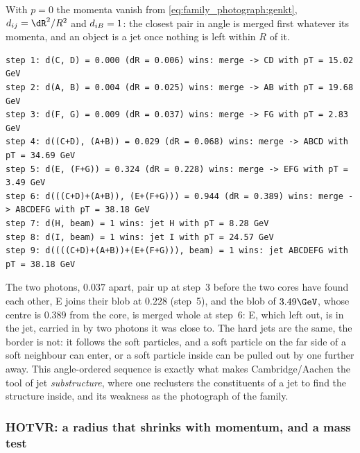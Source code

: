 With $p=0$ the momenta vanish from \cref{eq:family_photograph:genkt},
$\dij=\dR^2/R^2$ and $d_{iB}=1$: the closest pair in angle is merged first
whatever its momenta, and an object is a jet once nothing is left within
$R$ of it.
\begin{verbatim}
step 1: d(C, D) = 0.000 (dR = 0.006) wins: merge -> CD with pT = 15.02 GeV
step 2: d(A, B) = 0.004 (dR = 0.025) wins: merge -> AB with pT = 19.68 GeV
step 3: d(F, G) = 0.009 (dR = 0.037) wins: merge -> FG with pT = 2.83 GeV
step 4: d((C+D), (A+B)) = 0.029 (dR = 0.068) wins: merge -> ABCD with pT = 34.69 GeV
step 5: d(E, (F+G)) = 0.324 (dR = 0.228) wins: merge -> EFG with pT = 3.49 GeV
step 6: d(((C+D)+(A+B)), (E+(F+G))) = 0.944 (dR = 0.389) wins: merge -> ABCDEFG with pT = 38.18 GeV
step 7: d(H, beam) = 1 wins: jet H with pT = 8.28 GeV
step 8: d(I, beam) = 1 wins: jet I with pT = 24.57 GeV
step 9: d((((C+D)+(A+B))+(E+(F+G))), beam) = 1 wins: jet ABCDEFG with pT = 38.18 GeV
\end{verbatim}
The two photons, $0.037$ apart, pair up at step~3 before the two cores
have found each other, E joins their blob at $0.228$ (step~5), and the
blob of $3.49\GeV$, whose centre is $0.389$ from the core, is merged
whole at step~6: E, which \antikt left out, is in the jet, carried in by
two photons it was close to. The hard jets are the same, the border is
not: it follows the soft particles, and a soft particle on the far side
of a soft neighbour can enter, or a soft particle inside can be pulled
out by one further away. This angle-ordered sequence is exactly what
makes Cambridge/Aachen the tool of jet \emph{substructure}, where one
reclusters the constituents of a jet to find the structure inside, and
its weakness as the photograph of the family.

\subsubsection{HOTVR: a radius that shrinks with momentum, and a mass test}

